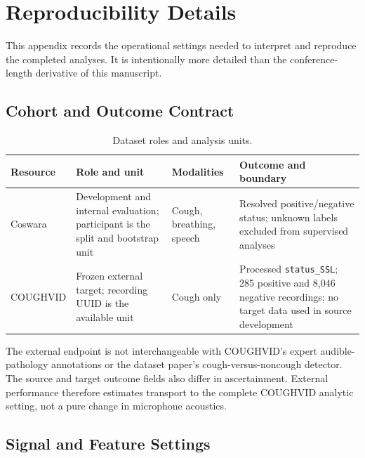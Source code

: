 \section{Reproducibility Details}

This appendix records the operational settings needed to interpret and
reproduce the completed analyses. It is intentionally more detailed than the
conference-length derivative of this manuscript.

\subsection{Cohort and Outcome Contract}

\begin{table}[!h]
\centering
\caption{Dataset roles and analysis units.}
\label{tab:data-contract}
\begin{tabularx}{\textwidth}{p{}p{}p{}X}
\toprule
Resource & Role and unit & Modalities & Outcome and boundary \\
\midrule
Coswara & Development and internal evaluation; participant is the split and
bootstrap unit & Cough, breathing, speech & Resolved positive/negative status;
unknown labels excluded from supervised analyses \\
COUGHVID & Frozen external target; recording UUID is the available unit &
Cough only & Processed \texttt{status\_SSL}; 285 positive and 8,046 negative
recordings; no target data used in source development \\
\bottomrule
\end{tabularx}
\end{table}

The external endpoint is not interchangeable with COUGHVID's expert audible-
pathology annotations or the dataset paper's cough-versus-noncough detector.
The source and target outcome fields also differ in ascertainment. External
performance therefore estimates transport to the complete COUGHVID analytic
setting, not a pure change in microphone acoustics.

\subsection{Signal and Feature Settings}


